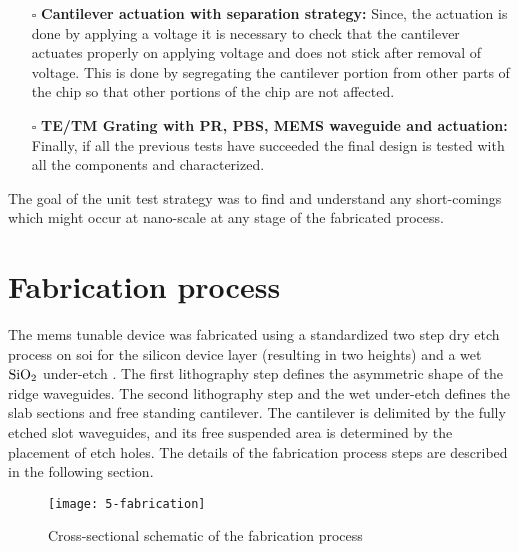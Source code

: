 \documentclass[../report.tex]{subfiles}
\begin{document}
\begin{itemize}[leftmargin=*]
	\item[$\square$] \textbf{Cantilever actuation with separation strategy:} Since, the actuation is done by applying a voltage it is necessary to check that the cantilever actuates properly on applying voltage and does not stick after removal of voltage. This is done by segregating the cantilever portion from other parts of the chip so that other portions of the chip are not affected. 
	
	\item[$\square$] \textbf{TE/TM Grating with PR, PBS, MEMS waveguide and actuation:} Finally, if all the previous tests have succeeded the final design is tested with all the components and characterized.
\end{itemize}
	
\noindent The goal of the unit test strategy was to find and understand any short-comings which might occur at nano-scale at any stage of the fabricated process.
	


\section{Fabrication process}\label{sec:fab_process}
The \gls{mems} tunable device was fabricated using a standardized two step dry etch process on \gls{soi} for the silicon device layer (resulting in two heights) and a wet $\mathrm{SiO_2}$ under-etch \cite{errando-herranz_low-power_2015}. The first lithography step defines the asymmetric shape of the ridge waveguides. The second lithography step and the wet under-etch defines the slab sections and free standing cantilever. The cantilever is delimited by the fully etched slot waveguides, and its free suspended area is determined by the placement of etch holes. The details of the fabrication process steps are described in the following section.

\begin{figure}[h] %
	\centering
	\texttt{[image: 5-fabrication]}
	\caption{Cross-sectional schematic of the fabrication process}
	\label{fig:5_fabrication}
\end{figure}

\end{document}
